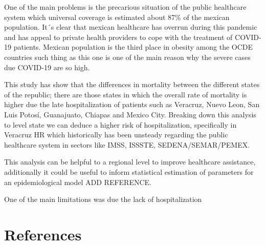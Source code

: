 \documentclass[
]{article}
\begin{document}
One of the main problems is the precarious situation of the public
healthcare system which universal coverage is estimated about 87\% of
the mexican population. It´s clear that mexican healthcare has overrun
during this pandemic and has appeal to private health providers to cope
with the treatment of COVID-19 patients. Mexican population is the third
place in obesity among the OCDE countries such thing as this one is one
of the main reason why the severe cases due COVID-19 are so high.

This study has show that the differences in mortality between the
different states of the republic; there are those states in which the
overall rate of mortality is higher due the late hospitalization of
patients such as Veracruz, Nuevo Leon, San Luis Potosí, Guanajuato,
Chiapas and Mexico City. Breaking down this analysis to level state we
can deduce a higher risk of hospitalization, specifically in Veracruz HR
which historically has been unsteady regarding the public healthcare
system in sectors like IMSS, ISSSTE, SEDENA/SEMAR/PEMEX.

This analysis can be helpful to a regional level to improve healthcare
assistance, additionally it could be useful to inform statistical
estimation of parameters for an epidemiological model ADD REFERENCE.

One of the main limitations was due the lack of hospitalization

\hypertarget{references}{%
\section*{References}\label{references}}
\end{document}
